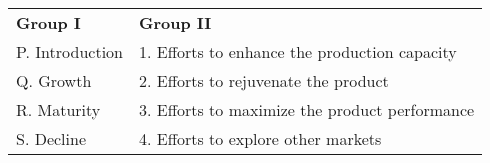 \begin{center}
\begin{tabular}{ll}

\textbf{Group I} & \textbf{Group II} \\

P. Introduction & 1. Efforts to enhance the production capacity \\
Q. Growth & 2. Efforts to rejuvenate the product \\
R. Maturity & 3. Efforts to maximize the product performance \\
S. Decline & 4. Efforts to explore other markets \\

\end{tabular}
\end{center}